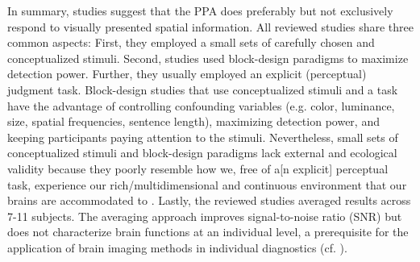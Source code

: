 \documentclass[english]{article}
\begin{document}
In summary, studies suggest that the PPA does preferably but not exclusively
respond to visually presented spatial information.
All reviewed studies share three common aspects:
First, they employed a small sets of carefully chosen and conceptualized
stimuli.
Second, studies used block-design paradigms to maximize detection power.
Further, they usually employed an explicit (perceptual) judgment task.
Block-design studies that use conceptualized stimuli and a task have the
advantage of controlling confounding variables (e.g. color, luminance, size,
spatial frequencies, sentence length), maximizing detection power, and keeping
participants paying attention to the stimuli.
Nevertheless, small sets of conceptualized stimuli and block-design paradigms
lack external and ecological validity \citep{westfall2016fixing,
hasson2004intersubject} because they poorly resemble how we, free of a[n
explicit] perceptual task, experience our rich/multidimensional and continuous
environment that our brains are accommodated to
\citep{sonkusare2019naturalistic}.
Lastly, the reviewed studies averaged results across 7-11 subjects.
The averaging approach improves signal-to-noise ratio (SNR) but does not
characterize brain functions at an individual level, a prerequisite for the
application of brain imaging methods in individual diagnostics (cf.
\cite{dubois2016building, eickhoff2020towards}).
\end{document}
